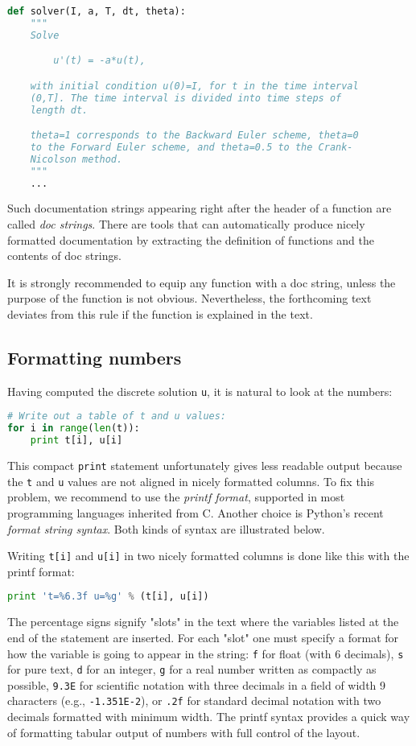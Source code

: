 \documentclass[graybox,sectrefs,envcountresetchap,open=right,final]{svmonodo}
\begin{document}
\begin{lstlisting}[language=Python,style=blue1_bluegreen]
def solver(I, a, T, dt, theta):
    """
    Solve

        u'(t) = -a*u(t),

    with initial condition u(0)=I, for t in the time interval
    (0,T]. The time interval is divided into time steps of
    length dt.

    theta=1 corresponds to the Backward Euler scheme, theta=0
    to the Forward Euler scheme, and theta=0.5 to the Crank-
    Nicolson method.
    """
    ...
\end{lstlisting}
Such documentation strings appearing right after the header of
a function are called \emph{doc strings}. There are tools that can automatically
produce nicely formatted documentation by extracting the definition of
functions and the contents of doc strings.

It is strongly recommended to equip any function with a doc string,
unless the purpose of the function
is not obvious. Nevertheless, the forthcoming
text deviates from this rule if the function is explained in the text.


\subsection{Formatting numbers}

Having computed the discrete solution \texttt{u}, it is natural to look at
the numbers:
\begin{lstlisting}[language=Python,style=blue1_bluegreen]
# Write out a table of t and u values:
for i in range(len(t)):
    print t[i], u[i]
\end{lstlisting}
This compact \texttt{print} statement unfortunately gives less readable output
because the \texttt{t} and \texttt{u} values are not aligned in nicely formatted columns.
To fix this problem, we recommend to use the \emph{printf format}, supported in most
programming languages inherited from C. Another choice is
Python's recent \emph{format string syntax}. Both kinds of syntax are illustrated
below.


Writing \texttt{t[i]} and \texttt{u[i]} in two nicely formatted columns is done like
this with the printf format:

\begin{lstlisting}[language=Python,style=blue1_bluegreen]
print 't=%6.3f u=%g' % (t[i], u[i])
\end{lstlisting}
The percentage signs signify "slots" in the text where the variables
listed at the end of the statement are inserted. For each "slot" one
must specify a format for how the variable is going to appear in the
string: \texttt{f} for float (with 6 decimals),
\texttt{s} for pure text, \texttt{d} for an integer, \texttt{g} for a real number
written as compactly as possible, \texttt{9.3E} for scientific notation with
three decimals in a field of width 9 characters (e.g., \texttt{-1.351E-2}),
or \texttt{.2f} for standard decimal notation with two decimals
formatted with minimum width. The printf syntax provides a quick way
of formatting tabular output of numbers with full control of the
layout.
\end{document}
